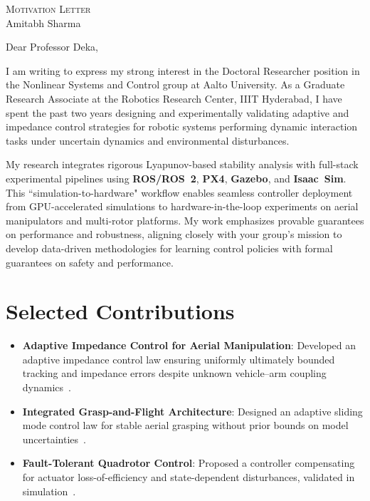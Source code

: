 


\begin{center}
    {\Large \scshape Motivation Letter} \\[2pt]
    \vspace{4pt}
    {Amitabh Sharma}
\end{center}

\hspace*{-16pt}Dear Professor Deka,

\vspace{10pt}

I am writing to express my strong interest in the Doctoral Researcher position in the Nonlinear Systems and Control group at Aalto University. As a Graduate Research Associate at the Robotics Research Center, IIIT Hyderabad, I have spent the past two years designing and experimentally validating adaptive and impedance control strategies for robotic systems performing dynamic interaction tasks under uncertain dynamics and environmental disturbances.

\vspace{4pt}
My research integrates rigorous Lyapunov-based stability analysis with full-stack experimental pipelines using \textbf{ROS/ROS~2}, \textbf{PX4}, \textbf{Gazebo}, and \textbf{Isaac~Sim}. This ``simulation-to-hardware" workflow enables seamless controller deployment from GPU-accelerated simulations to hardware-in-the-loop experiments on aerial manipulators and multi-rotor platforms. My work emphasizes provable guarantees on performance and robustness, aligning closely with your group's mission to develop data-driven methodologies for learning control policies with formal guarantees on safety and performance.

\section*{Selected Contributions}
\begin{itemize}[leftmargin=0.2in,noitemsep,topsep=0pt]
    \item \textbf{Adaptive Impedance Control for Aerial Manipulation}: Developed an adaptive impedance control law ensuring uniformly ultimately bounded tracking and impedance errors despite unknown vehicle–arm coupling dynamics~\cite{Impedance}.
    \item \textbf{Integrated Grasp-and-Flight Architecture}: Designed an adaptive sliding mode control law for stable aerial grasping without prior bounds on model uncertainties~\cite{TMECH}.
    \item \textbf{Fault-Tolerant Quadrotor Control}: Proposed a controller compensating for actuator loss-of-efficiency and state-dependent disturbances, validated in simulation~\cite{FTC}.
\end{itemize}

